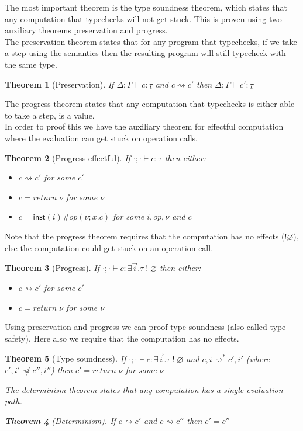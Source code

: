 \documentclass[12pt]{article}
\newtheorem{theorem}{Theorem}
\newcommand\op[0]{op}
\newcommand\ty[0]{\tau}
\newcommand\cty[0]{\underline{\ty}}
\newcommand\aty[2]{#1 \; ! \; #2}
\newcommand\texistss[2]{\exists \overrightarrow{#1} . #2}
\newcommand\val[0]{\nu}
\newcommand\vinst[1]{\mathsf{inst}(#1)}
\newcommand\comp[0]{c}
\newcommand\creturn[1]{\textit{return} \; #1}
\newcommand\copi[5]{#1 \# #2(#3 ; #4 . #5)}
\begin{document}
The most important theorem is the type soundness theorem, which states that any computation that typechecks will not get stuck.
This is proven using two auxiliary theorems preservation and progress.\\
The preservation theorem states that for any program that typechecks, if we take a step using the semantics then the resulting program will still typecheck with the same type.
\begin{theorem}[Preservation]
If $\Delta;\Gamma \vdash \comp : \cty$ and $\comp \rightsquigarrow \comp'$ then $\Delta;\Gamma \vdash \comp' : \cty$
\end{theorem}
The progress theorem states that any computation that typechecks is either able to take a step, is a value.\\
In order to proof this we have the auxiliary theorem for effectful computation where the evaluation can get stuck on operation calls.
\begin{theorem}[Progress effectful]
If $\cdot;\cdot \vdash \comp : \cty$ then either:
\begin{itemize}
\item $\comp \rightsquigarrow \comp'$ for some $\comp'$
\item $\comp = \creturn{\val}$ for some $\val$
\item $\comp = \copi{\vinst{i}}{\op}{\val}{x}{\comp}$ for some $i, \op, \val$ and $\comp$
\end{itemize}
\end{theorem}
Note that the progress theorem requires that the computation has no effects ($!\varnothing$), else the computation could get stuck on an operation call.
\begin{theorem}[Progress]
If $\cdot;\cdot \vdash \comp : \texistss{i}{\aty{\ty}{\varnothing}}$ then either:
\begin{itemize}
\item $\comp \rightsquigarrow \comp'$ for some $\comp'$
\item $\comp = \creturn{\val}$ for some $\val$
\end{itemize}
\end{theorem}

Using preservation and progress we can proof type soundness (also called type safety). Here also we require that the computation has no effects.
\begin{theorem}[Type soundness]
If $\cdot;\cdot \vdash \comp : \texistss{i}{\aty{\ty}{\varnothing}}$ and $\comp, i \rightsquigarrow^* \comp', i'$ (where $\comp', i' \not\rightsquigarrow \comp'', i''$) then $\comp' = \creturn{\val}$ for some $\val$

The determinism theorem states that any computation has a single evaluation path.
\begin{theorem}[Determinism]
If $\comp \rightsquigarrow \comp'$ and $\comp \rightsquigarrow \comp''$ then $\comp' = \comp''$  \\
\end{theorem}
\end{theorem}
\end{document}
